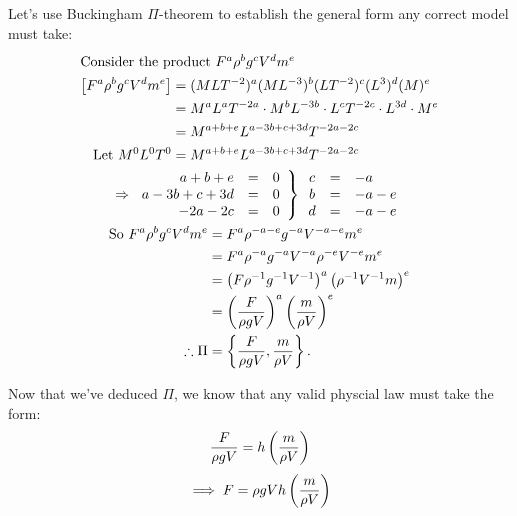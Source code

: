 \documentclass{report}
\begin{document}
Let's use Buckingham $\Pi$-theorem to establish the general form any correct model must take:
\begin{gather*}
	\intertext{Consider the product $F^a\rho^bg^cV^dm^e$} 
	\begin{aligned}
		\left[ F^a\rho^bg^cV^dm^e \right] &= (MLT^{-2})^a(ML^{-3})^b(LT^{-2})^c(L^3)^d(M)^e \\
			&= M^aL^aT^{-2a}\cdot M^bL^{-3b}\cdot L^cT^{-2c}\cdot L^{3d}\cdot M^e \\
			&= M^{a+b+e}L^{a-3b+c+3d}T^{-2a-2c} \\
		\text{Let } M^0L^0T^0 &= M^{a+b+e}L^{a-3b+c+3d}T^{-2a-2c}
	\end{aligned} \\
	\Rightarrow\left.\begin{array}{rcc}
		a + b + e & = & 0 \\
		a - 3b + c + 3d & = & 0 \\
		-2a - 2c & = & 0
	\end{array}\right\rbrace\begin{array}{ccl}
		c & = & -a \\
		b & = & -a-e \\
		d & = & -a-e
	\end{array}\\
	\begin{aligned}
		\text{So } F^a\rho^bg^cV^dm^e &= F^a\rho^{-a-e}g^{-a}V^{-a-e}m^e \\
			&= F^a\rho^{-a}g^{-a}V^{-a}\rho^{-e}V^{-e}m^e \\
			&= \left( F\rho^{-1}g^{-1}V^{-1} \right)^a \left( \rho^{-1}V^{-1}m \right)^e \\
			&= \left( \frac{F}{\rho gV} \right)^a \left( \frac{m}{\rho V} \right)^e \\
		\therefore \Pi &= \left\lbrace \frac{F}{\rho gV}, \frac{m}{\rho V} \right\rbrace.
	\end{aligned}
\end{gather*}

Now that we've deduced $\Pi$, we know that any valid physcial law must take the form:
$$
	\frac{F}{\rho gV} = h\left( \frac{m}{\rho V} \right)
$$
$$
	\implies F = \rho gV h\left( \frac{m}{\rho V} \right)
$$

\end{document}
